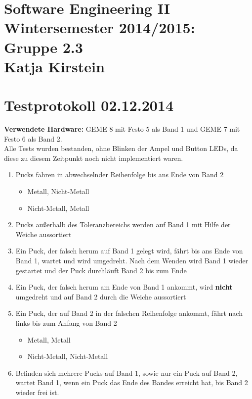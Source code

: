 \documentclass[a4paper,10pt]{article}
\begin{document}
\section*{\small{Software Engineering II \\ Wintersemester 2014/2015: Gruppe 2.3 \\ Katja Kirstein}}
\section*{Testprotokoll 02.12.2014}
\textbf{Verwendete Hardware:} GEME 8 mit Festo 5 als Band 1 und GEME 7 mit Festo 6 als Band 2.\\
Alle Tests wurden bestanden, ohne Blinken der Ampel und Button LEDs, da diese zu diesem Zeitpunkt noch nicht implementiert waren.
\newline
\begin{enumerate}
  \item  Pucks fahren in abwechselnder Reihenfolge bis ans Ende von Band 2
  \begin{itemize}
    \item Metall, Nicht-Metall
    \item Nicht-Metall, Metall
  \end{itemize}
  \item Pucks außerhalb des Toleranzbereichs werden auf Band 1 mit Hilfe der Weiche aussortiert
  \item Ein Puck, der falsch herum auf Band 1 gelegt wird, fährt bis ans Ende von Band 1, wartet und wird umgedreht. Nach dem Wenden wird Band 1 wieder gestartet und der Puck durchläuft Band 2 bis zum Ende
  \item Ein Puck, der falsch herum am Ende von Band 1 ankommt, wird \textbf{nicht} umgedreht und auf Band 2 durch die Weiche aussortiert
  \item Ein Puck, der auf Band 2 in der falschen Reihenfolge ankommt, fährt nach links bis zum Anfang von Band 2
  \begin{itemize}
    \item Metall, Metall
    \item Nicht-Metall, Nicht-Metall
  \end{itemize}
  \item Befinden sich mehrere Pucks auf Band 1, sowie nur ein Puck auf Band 2, wartet Band 1, wenn ein Puck das Ende des Bandes erreicht hat, bis Band 2 wieder frei ist.
\end{enumerate}
\end{document}

